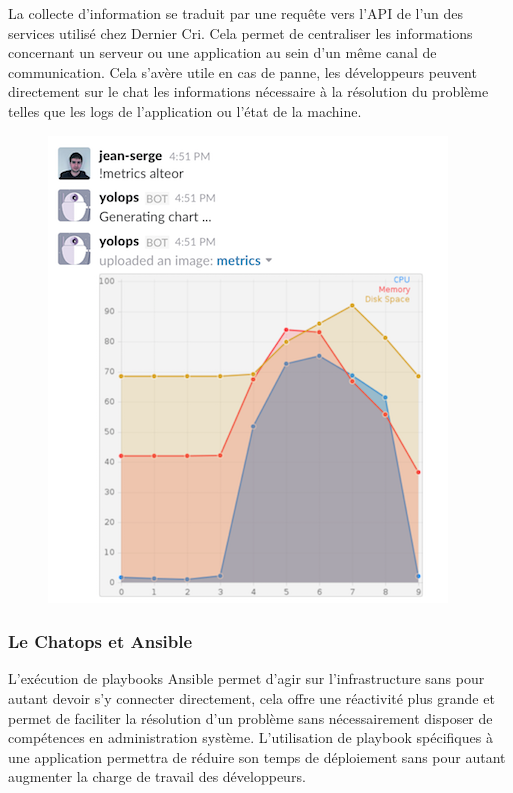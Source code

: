 La collecte d'information se traduit par une requête vers l'API de l'un
des services utilisé chez Dernier Cri. Cela permet de centraliser les
informations concernant un serveur ou une application au sein d'un même
canal de communication. Cela s'avère utile en cas de panne, les
développeurs peuvent directement sur le chat les informations nécessaire
à la résolution du problème telles que les logs de l'application ou
l'état de la machine.

\begin{figure}[htbp]
\centering
\includegraphics{metrics.png}
\caption{}
\end{figure}

\newpage

\subsubsection{Le Chatops et Ansible}\label{le-chatops-et-ansible}

L'exécution de playbooks Ansible permet d'agir sur l'infrastructure sans
pour autant devoir s'y connecter directement, cela offre une réactivité
plus grande et permet de faciliter la résolution d'un problème sans
nécessairement disposer de compétences en administration système.
L'utilisation de playbook spécifiques à une application permettra de
réduire son temps de déploiement sans pour autant augmenter la charge de
travail des développeurs.

